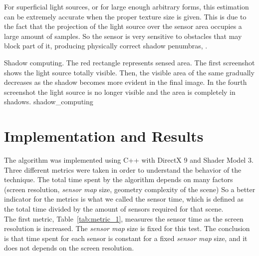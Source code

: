 \documentclass[10pt, conference]{IEEEtran}
\begin{document}
For superficial light sources, or for large enough arbitrary forms, this estimation can be extremely accurate when the proper texture size is given. 
This is due to the fact that the projection of the light source over the sensor area occupies a large amount of samples. 
So the sensor is very sensitive to obstacles that may block part of it, producing physically correct shadow penumbras, .

\subimages
	{Shadow computing. The red rectangle represents sensed area. 
	The first screenshot shows the light source totally visible. 
	Then, the visible area of the same gradually decreases as the shadow becomes more evident in the final image. 
	In the fourth screenshot the light source is no longer visible and the area is completely in shadows.}
	{shadow_computing}{
}


\section{Implementation and Results}
%
The algorithm was implemented using C++ with DirectX 9 and Shader Model 3. 
Three different metrics were taken in order to understand the behavior of the technique.
The total time spent by the algorithm depends on many factors (screen resolution, \emph{sensor map} size, geometry complexity of the scene)
So a better indicator for the metrics is what we called the sensor time, which is defined as the total time divided by the amount of sensors required for that scene.\\

The first metric, Table~\ref{tab:metric_1}, measures the sensor time as the screen resolution is increased. The \emph{sensor map} size is fixed for this test.
The conclusion is that time spent for each sensor is constant for a fixed \emph{sensor map} size, and it does not depends on the screen resolution.\\
\end{document}
